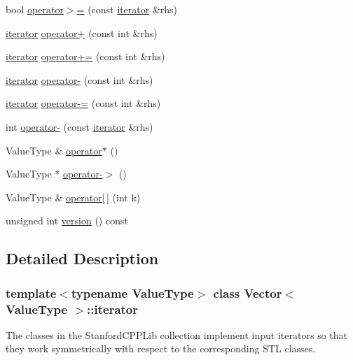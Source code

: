 \begin{DoxyCompactItemize}
\item 
bool \mbox{\hyperlink{classVector_1_1iterator_a41d2ff94db2ea5dd92c31f495143a968}{operator$>$=}} (const \mbox{\hyperlink{classVector_1_1iterator}{iterator}} \&rhs)
\item 
\mbox{\hyperlink{classVector_1_1iterator}{iterator}} \mbox{\hyperlink{classVector_1_1iterator_a92a558bb60ce7d4100520587da3043a7}{operator+}} (const int \&rhs)
\item 
\mbox{\hyperlink{classVector_1_1iterator}{iterator}} \mbox{\hyperlink{classVector_1_1iterator_a3d235cc15e3d6f4c8ebcff1e08b7add8}{operator+=}} (const int \&rhs)
\item 
\mbox{\hyperlink{classVector_1_1iterator}{iterator}} \mbox{\hyperlink{classVector_1_1iterator_ab45a48101ce148b2b762f1d0ff4f3794}{operator-\/}} (const int \&rhs)
\item 
\mbox{\hyperlink{classVector_1_1iterator}{iterator}} \mbox{\hyperlink{classVector_1_1iterator_a5ec3f04a58f155eea62bf49e0230148e}{operator-\/=}} (const int \&rhs)
\item 
int \mbox{\hyperlink{classVector_1_1iterator_a7a011ddf4b9d05e457e88e4d0a3b9e4f}{operator-\/}} (const \mbox{\hyperlink{classVector_1_1iterator}{iterator}} \&rhs)
\item 
Value\+Type \& \mbox{\hyperlink{classVector_1_1iterator_ae8e4de4ccddd2f0611e2fac3945d010d}{operator$\ast$}} ()
\item 
Value\+Type $\ast$ \mbox{\hyperlink{classVector_1_1iterator_a6339a188a6f0fca25c579a4a5647de04}{operator-\/$>$}} ()
\item 
Value\+Type \& \mbox{\hyperlink{classVector_1_1iterator_aa7d2060a0008b6a2e9fdfece93fe4929}{operator\mbox{[}$\,$\mbox{]}}} (int k)
\item 
unsigned int \mbox{\hyperlink{classVector_1_1iterator_ad0e79d724133c3ebd1e4ea42d290aaab}{version}} () const
\end{DoxyCompactItemize}


\subsection{Detailed Description}
\subsubsection*{template$<$typename Value\+Type$>$\newline
class Vector$<$ Value\+Type $>$\+::iterator}

The classes in the Stanford\+C\+P\+P\+Lib collection implement input iterators so that they work symmetrically with respect to the corresponding S\+TL classes. 



